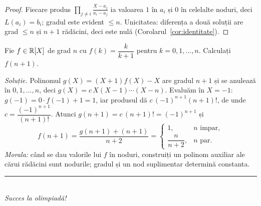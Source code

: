 \begin{proof}
Fiecare produs $\prod_{j\neq i}\frac{X-a_j}{a_i-a_j}$ ia valoarea $1$ în $a_i$ și $0$ în celelalte noduri, deci $L(a_i)=b_i$; gradul este evident $\le n$. Unicitatea: diferența a două soluții are grad $\le n$ și $n+1$ rădăcini, deci este nulă (Corolarul~\ref{cor:identitate}).
\end{proof}

\begin{aplicatie}\label{apl:auxiliar}
Fie $f\in\mathbb{R}[X]$ de grad $n$ cu $f(k)=\dfrac{k}{k+1}$ pentru $k=0,1,\dots,n$. Calculați $f(n+1)$.

\emph{Soluție.} Polinomul $g(X)=(X+1)f(X)-X$ are gradul $n+1$ și se anulează în $0,1,\dots,n$, deci
$g(X)=c\,X(X-1)\cdots(X-n)$. Evaluăm în $X=-1$: $g(-1)=0\cdot f(-1)+1=1$, iar produsul dă $c\,(-1)^{n+1}(n+1)!$, de unde $c=\dfrac{(-1)^{n+1}}{(n+1)!}$. Atunci $g(n+1)=c\,(n+1)!=(-1)^{n+1}$ și
\[
f(n+1)=\frac{g(n+1)+(n+1)}{n+2}=
\begin{cases}
1,&n\text{ impar},\\[2pt]
\dfrac{n}{n+2},&n\text{ par}.
\end{cases}
\]
\emph{Morala:} când se dau valorile lui $f$ în noduri, construiți un polinom auxiliar ale cărui rădăcini sunt nodurile; gradul și un nod suplimentar determină constanta.
\end{aplicatie}

\vspace{6pt}
\begin{center}
\rule{0.5\textwidth}{0.4pt}\\[4pt]
\small\emph{Succes la olimpiadă!}
\end{center}









